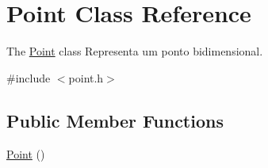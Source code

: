 \hypertarget{class_point}{}\section{Point Class Reference}
\label{class_point}


The \hyperlink{class_point}{Point} class Representa um ponto bidimensional.  




{\ttfamily \#include $<$point.\+h$>$}

\subsection*{Public Member Functions}
\begin{DoxyCompactItemize}
\item 
\hyperlink{class_point_ad92f2337b839a94ce97dcdb439b4325a}{Point} ()\hypertarget{class_point_ad92f2337b839a94ce97dcdb439b4325a}{}\label{class_point_ad92f2337b839a94ce97dcdb439b4325a}


\end{DoxyCompactItemize}
